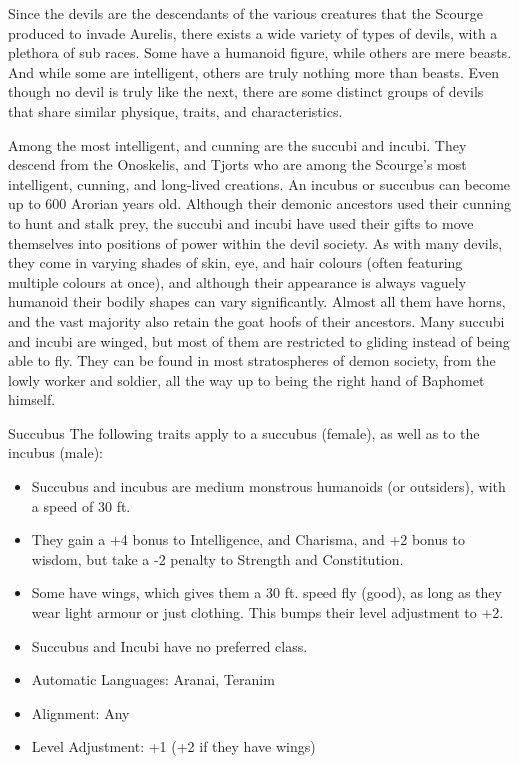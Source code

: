 Since the devils are the descendants of the various creatures that the Scourge
produced to invade Aurelis, there exists a wide variety of types of devils,
with a plethora of sub races. Some have a humanoid figure, while others are
mere beasts. And while some are intelligent, others are truly nothing more
than beasts. Even though no devil is truly like the next, there are some
distinct groups of devils that share similar physique, traits, and
characteristics.


Among the most intelligent, and cunning are the succubi and incubi. They
descend from the Onoskelis, and Tjorts who are among the Scourge's most
intelligent, cunning, and long-lived creations. An incubus or succubus can
become up to 600 Arorian years old. Although their demonic ancestors used
their cunning to hunt and stalk prey, the succubi and incubi have used their
gifts to move themselves into positions of power within the devil society.  As
with many devils, they come in varying shades of skin, eye, and hair colours
(often featuring multiple colours at once), and although their appearance is
always vaguely humanoid their bodily shapes can vary significantly. Almost all
them have horns, and the vast majority also retain the goat hoofs of their
ancestors. Many succubi and incubi are winged, but most of them are restricted
to gliding instead of being able to fly. They can be found in most
stratospheres of demon society, from the lowly worker and soldier, all the way
up to being the right hand of Baphomet himself.

\begin{35e}{Succubus}
  The following traits apply to a succubus (female), as well as to the incubus
  (male):
  \begin{itemize}[noitemsep]
  \item Succubus and incubus are medium monstrous humanoids (or outsiders), with
    a speed of 30 ft.
  \item They gain a +4 bonus to Intelligence, and Charisma, and +2 bonus to
    wisdom, but take a -2 penalty to Strength and Constitution.
  \item Some have wings, which gives them a 30 ft. speed fly (good), as long
    as they wear light armour or just clothing. This bumps their level adjustment
    to +2.
  \item Succubus and Incubi have no preferred class.
  \item Automatic Languages: Aranai, Teranim
  \item Alignment: Any
  \item Level Adjustment: +1 (+2 if they have wings)
  \end{itemize}
\end{35e}

